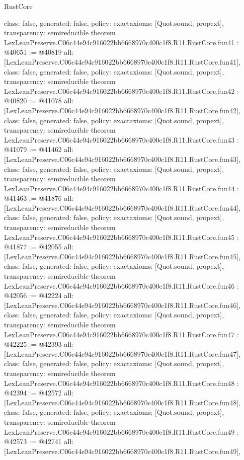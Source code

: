 \begin{lexlean}{RustCore}
\begin{coremodule}
{  class: false,
  generated: false,
  policy: exact{axioms: [Quot.sound, propext]},
  transparency: semireducible
}
theorem LexLeanPreserve.C06c44e94c916022bb6668970c400c1f8.R11.RustCore.fun41 : @40651 := @40819 {
  all: [LexLeanPreserve.C06c44e94c916022bb6668970c400c1f8.R11.RustCore.fun41],
  class: false,
  generated: false,
  policy: exact{axioms: [Quot.sound, propext]},
  transparency: semireducible
}
theorem LexLeanPreserve.C06c44e94c916022bb6668970c400c1f8.R11.RustCore.fun42 : @40820 := @41078 {
  all: [LexLeanPreserve.C06c44e94c916022bb6668970c400c1f8.R11.RustCore.fun42],
  class: false,
  generated: false,
  policy: exact{axioms: [Quot.sound, propext]},
  transparency: semireducible
}
theorem LexLeanPreserve.C06c44e94c916022bb6668970c400c1f8.R11.RustCore.fun43 : @41079 := @41462 {
  all: [LexLeanPreserve.C06c44e94c916022bb6668970c400c1f8.R11.RustCore.fun43],
  class: false,
  generated: false,
  policy: exact{axioms: [Quot.sound, propext]},
  transparency: semireducible
}
theorem LexLeanPreserve.C06c44e94c916022bb6668970c400c1f8.R11.RustCore.fun44 : @41463 := @41876 {
  all: [LexLeanPreserve.C06c44e94c916022bb6668970c400c1f8.R11.RustCore.fun44],
  class: false,
  generated: false,
  policy: exact{axioms: [Quot.sound, propext]},
  transparency: semireducible
}
theorem LexLeanPreserve.C06c44e94c916022bb6668970c400c1f8.R11.RustCore.fun45 : @41877 := @42055 {
  all: [LexLeanPreserve.C06c44e94c916022bb6668970c400c1f8.R11.RustCore.fun45],
  class: false,
  generated: false,
  policy: exact{axioms: [Quot.sound, propext]},
  transparency: semireducible
}
theorem LexLeanPreserve.C06c44e94c916022bb6668970c400c1f8.R11.RustCore.fun46 : @42056 := @42224 {
  all: [LexLeanPreserve.C06c44e94c916022bb6668970c400c1f8.R11.RustCore.fun46],
  class: false,
  generated: false,
  policy: exact{axioms: [Quot.sound, propext]},
  transparency: semireducible
}
theorem LexLeanPreserve.C06c44e94c916022bb6668970c400c1f8.R11.RustCore.fun47 : @42225 := @42393 {
  all: [LexLeanPreserve.C06c44e94c916022bb6668970c400c1f8.R11.RustCore.fun47],
  class: false,
  generated: false,
  policy: exact{axioms: [Quot.sound, propext]},
  transparency: semireducible
}
theorem LexLeanPreserve.C06c44e94c916022bb6668970c400c1f8.R11.RustCore.fun48 : @42394 := @42572 {
  all: [LexLeanPreserve.C06c44e94c916022bb6668970c400c1f8.R11.RustCore.fun48],
  class: false,
  generated: false,
  policy: exact{axioms: [Quot.sound, propext]},
  transparency: semireducible
}
theorem LexLeanPreserve.C06c44e94c916022bb6668970c400c1f8.R11.RustCore.fun49 : @42573 := @42741 {
  all: [LexLeanPreserve.C06c44e94c916022bb6668970c400c1f8.R11.RustCore.fun49],
}
\end{coremodule}
\end{lexlean}
